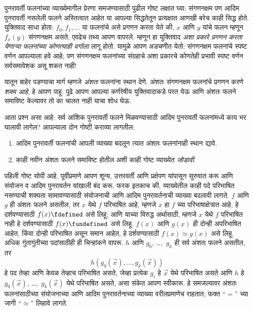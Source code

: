 \documentclass[../../../include/open-logic-section]{subfiles}
\begin{document}


पुनरावर्ती फलनांच्या व्याख्येमागील प्रेरणा समजण्यासाठी पुढील गोष्ट लक्षात
घ्या: संगणनक्षम पण आदिम पुनरावर्ती नसलेली फलने अस्तित्वात आहेत या आपल्या
सिद्धतेतून प्रत्यक्षात आणखी बरेच काही सिद्ध होते. युक्तिवाद साधा होता:
$f_0,f_1,\dots$ या फलनांचे असे प्रगणन करता येते की, $x$ आणि $y$ यांचे फलन
म्हणून $f_x(y)$ संगणनक्षम असते, एवढेच तथ्य आपण वापरले. म्हणून हा युक्तिवाद
\emph{अशा प्रकारे प्रगणन करता येणाऱ्या फलनांच्या कोणत्याही वर्गाला} लागू
होतो. यामुळे आपण अडचणीत येतो: संगणनक्षम फलनांचे स्पष्ट वर्णन आपल्याला हवे
आहे; पण संगणनक्षम फलनांच्या संग्रहाचे अशा प्रकारचे कोणतेही प्रभावी स्पष्ट
वर्णन सर्वसमावेशक असू शकत नाही!

यातून बाहेर पडण्याचा मार्ग म्हणजे \emph{अंशतः} फलनांना स्थान देणे. अंशतः
संगणनक्षम फलनांचे प्रगणन करणे \emph{शक्य आहे}, हे आपण पाहू.
 पुढे आपण आपल्या
कर्णरेषीय युक्तिवादाकडे परत येऊ आणि अंशतः फलने समाविष्ट केल्यावर तो का
चालत नाही याचा शोध घेऊ.

आता प्रश्न असा आहे: सर्व आंशिक पुनरावर्ती फलने मिळवण्यासाठी आदिम पुनरावर्ती
फलनांमध्ये काय भर घालावी लागेल? आपल्याला दोन गोष्टी कराव्या लागतील:
\begin{enumerate}
\item आदिम पुनरावर्ती फलनांची आपली व्याख्या बदलून त्यात अंशतः फलनांनाही
  स्थान द्यावे.
\item काही नवीन अंशतः फलने समाविष्ट होतील अशी काही गोष्ट व्याख्येत
  \emph{जोडावी}.
\end{enumerate}

पहिली गोष्ट सोपी आहे. पूर्वीप्रमाणे आपण शून्य, उत्तरवर्ती आणि प्रक्षेपण
यांपासून सुरुवात करू आणि संयोजन व आदिम पुनरावर्तन यांखाली बंद करू. फरक
इतकाच की, व्याख्येतील काही पदे परिभाषित नसण्याची शक्यता सामावण्यासाठी
संयोजनाची आणि आदिम पुनरावर्तनाची व्याख्या बदलावी लागते. $f$ आणि $g$ ही
अंशतः फलने असतील, तर $x$ येथे $f$ परिभाषित आहे, म्हणजे $x$ हा $f$ च्या
परिभाषाक्षेत्रात आहे, हे दर्शवण्यासाठी $f(x) \fdefined$ असे लिहू; आणि
याच्या विरुद्ध अर्थासाठी, म्हणजे $x$ येथे $f$ परिभाषित नाही हे दर्शवण्यासाठी
$f(x) \fundefined$ असे लिहू. $f(x)$ आणि $g(x)$ ही दोन्ही अपरिभाषित आहेत,
किंवा दोन्ही परिभाषित असून समान आहेत, हे दर्शवण्यासाठी $f(x) \simeq g(x)$
असे लिहू. अधिक गुंतागुंतीच्या पदांसाठीही ही चिन्हांकने वापरू. $h$ आणि
$g_0$, \dots,~$g_k$ ही सर्व अंशतः फलने असतील, तर
\[
h(g_0(\vec x),\dots,g_k(\vec x))
\]
हे पद तेव्हा आणि केवळ तेव्हाच परिभाषित असते, जेव्हा प्रत्येक $g_i$ हे
$\vec x$ येथे परिभाषित असते आणि $h$ हे $g_0(\vec x)$, \dots,~$g_k(\vec x)$
येथे परिभाषित असते, असा संकेत आपण स्वीकारू. हे समजल्यावर अंशतः फलनांसाठीच्या
संयोजनाच्या आणि आदिम पुनरावर्तनाच्या व्याख्या वरीलप्रमाणेच राहतात; फक्त
``$=$'' च्या जागी ``$\simeq$'' लिहावे लागते.
\end{document}
